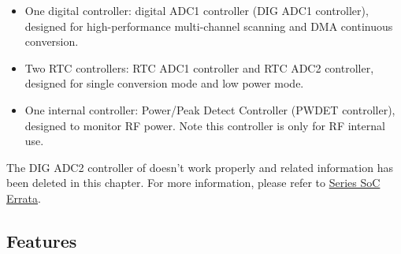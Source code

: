 \documentclass[main\_\_EN.tex]{subfiles}
\begin{document}
\begin{itemize}
   \item One digital controller: digital ADC1 controller (DIG ADC1 controller), designed for high-performance multi-channel scanning and DMA continuous conversion.
   \item Two RTC controllers: RTC ADC1 controller and RTC ADC2 controller, designed for single conversion mode and low power mode.
\item One internal controller: Power/Peak Detect Controller (PWDET controller), designed to monitor RF power. Note this controller is only for RF internal use.
\end{itemize}

\begin{tiplisting}
The DIG ADC2 controller of \chipname{} doesn't work properly and related information has been deleted in this chapter. For more information, please refer to \href{\linkprefix\linkchiperrataEN}{\chipseries{} Series SoC Errata}.
\end{tiplisting}

\subsection{Features}
\end{document}
